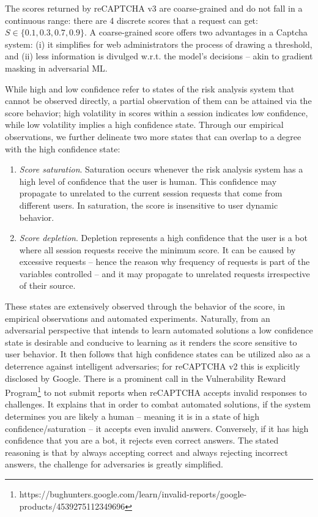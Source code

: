 The scores returned by reCAPTCHA v3 are coarse-grained and do not fall in a continuous range: there are 4 discrete scores that a request can get: $S \in \{0.1, 0.3, 0.7, 0.9\}$.
A coarse-grained score offers two advantages in a Captcha system: (i) it simplifies for web administrators the process of drawing a threshold, and (ii) less information is divulged w.r.t. the model's decisions -- akin to gradient masking in adversarial \gls{ML}.

While high and low confidence refer to states of the risk analysis system that cannot be observed directly, a partial observation of them can be attained via the score behavior; high volatility in scores within a session indicates low confidence, while low volatility implies a high confidence state.
Through our empirical observations, we further delineate two more states that can overlap to a degree with the high confidence state:
\begin{enumerate}
\item \emph{Score saturation}. Saturation occurs whenever the risk analysis system has a high level of confidence that the user is human.
This confidence may propagate to unrelated to the current session requests that come from different users.
In saturation, the score is insensitive to user dynamic behavior.
\item \emph{Score depletion}.
Depletion represents a high confidence that the user is a bot where all session requests receive the minimum score.
It can be caused by excessive requests -- hence the reason why frequency of requests is part of the variables controlled -- and it may propagate to unrelated requests irrespective of their source.
\end{enumerate}

These states are extensively observed through the behavior of the score, in empirical observations and automated experiments.
Naturally, from an adversarial perspective that intends to learn automated solutions a low confidence state is desirable and conducive to learning as it renders the score sensitive to user behavior.
It then follows that high confidence states can be utilized also as a deterrence against intelligent adversaries; for reCAPTCHA v2 this is explicitly disclosed by Google.
There is a prominent call in the Vulnerability Reward Program\footnote{https://bughunters.google.com/learn/invalid-reports/google-products/4539275112349696} to not submit reports when reCAPTCHA accepts invalid responses to challenges.
It explains that in order to combat automated solutions, if the system determines you are likely a human -- meaning it is in a state of high confidence/saturation -- it accepts even invalid answers.
Conversely, if it has high confidence that you are a bot, it rejects even correct answers.
The stated reasoning is that by always accepting correct and always rejecting incorrect answers, the challenge for adversaries is greatly simplified.

